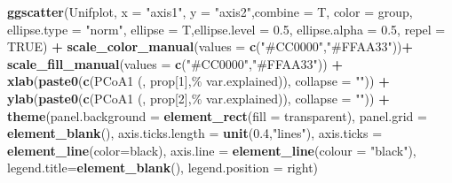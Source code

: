 \documentclass[
]{article}
\newenvironment{Shaded}{\begin{snugshade}}{\end{snugshade}}
\newcommand{\AttributeTok}[1]{\textcolor[rgb]{0.13,0.29,0.53}{#1}}
\newcommand{\ConstantTok}[1]{\textcolor[rgb]{0.56,0.35,0.01}{#1}}
\newcommand{\DecValTok}[1]{\textcolor[rgb]{0.00,0.00,0.81}{#1}}
\newcommand{\FloatTok}[1]{\textcolor[rgb]{0.00,0.00,0.81}{#1}}
\newcommand{\FunctionTok}[1]{\textcolor[rgb]{0.13,0.29,0.53}{\textbf{#1}}}
\newcommand{\NormalTok}[1]{#1}
\newcommand{\SpecialCharTok}[1]{\textcolor[rgb]{0.81,0.36,0.00}{\textbf{#1}}}
\newcommand{\StringTok}[1]{\textcolor[rgb]{0.31,0.60,0.02}{#1}}
\begin{document}
\begin{Shaded}
\begin{Highlighting}[]
\FunctionTok{ggscatter}\NormalTok{(Unifplot, }\AttributeTok{x =} \StringTok{"axis1"}\NormalTok{, }\AttributeTok{y =} \StringTok{"axis2"}\NormalTok{,}\AttributeTok{combine =}\NormalTok{ T, }\AttributeTok{color =} \StringTok{\textquotesingle{}group\textquotesingle{}}\NormalTok{,}
          \AttributeTok{ellipse.type =} \StringTok{"norm"}\NormalTok{, }\AttributeTok{ellipse =}\NormalTok{ T,}\AttributeTok{ellipse.level =} \FloatTok{0.5}\NormalTok{, }\AttributeTok{ellipse.alpha =} \FloatTok{0.5}\NormalTok{, }\AttributeTok{repel =} \ConstantTok{TRUE}\NormalTok{) }\SpecialCharTok{+}
          \FunctionTok{scale\_color\_manual}\NormalTok{(}\AttributeTok{values =} \FunctionTok{c}\NormalTok{(}\StringTok{"\#CC0000"}\NormalTok{,}\StringTok{"\#FFAA33"}\NormalTok{))}\SpecialCharTok{+}
          \FunctionTok{scale\_fill\_manual}\NormalTok{(}\AttributeTok{values =} \FunctionTok{c}\NormalTok{(}\StringTok{"\#CC0000"}\NormalTok{,}\StringTok{"\#FFAA33"}\NormalTok{)) }\SpecialCharTok{+}
          \FunctionTok{xlab}\NormalTok{(}\FunctionTok{paste0}\NormalTok{(}\FunctionTok{c}\NormalTok{(}\StringTok{\textquotesingle{}PCoA1 (\textquotesingle{}}\NormalTok{, prop[}\DecValTok{1}\NormalTok{],}\StringTok{\textquotesingle{}\% var.explained)\textquotesingle{}}\NormalTok{), }\AttributeTok{collapse =} \StringTok{""}\NormalTok{)) }\SpecialCharTok{+} 
          \FunctionTok{ylab}\NormalTok{(}\FunctionTok{paste0}\NormalTok{(}\FunctionTok{c}\NormalTok{(}\StringTok{\textquotesingle{}PCoA1 (\textquotesingle{}}\NormalTok{, prop[}\DecValTok{2}\NormalTok{],}\StringTok{\textquotesingle{}\% var.explained)\textquotesingle{}}\NormalTok{), }\AttributeTok{collapse =} \StringTok{""}\NormalTok{)) }\SpecialCharTok{+}
          \FunctionTok{theme}\NormalTok{(}\AttributeTok{panel.background =} \FunctionTok{element\_rect}\NormalTok{(}\AttributeTok{fill =} \StringTok{\textquotesingle{}transparent\textquotesingle{}}\NormalTok{),}
                \AttributeTok{panel.grid =} \FunctionTok{element\_blank}\NormalTok{(),}
                \AttributeTok{axis.ticks.length =} \FunctionTok{unit}\NormalTok{(}\FloatTok{0.4}\NormalTok{,}\StringTok{"lines"}\NormalTok{),}
                \AttributeTok{axis.ticks =} \FunctionTok{element\_line}\NormalTok{(}\AttributeTok{color=}\StringTok{\textquotesingle{}black\textquotesingle{}}\NormalTok{),}
                \AttributeTok{axis.line =} \FunctionTok{element\_line}\NormalTok{(}\AttributeTok{colour =} \StringTok{"black"}\NormalTok{),}
                \AttributeTok{legend.title=}\FunctionTok{element\_blank}\NormalTok{(),}
                \AttributeTok{legend.position  =} \StringTok{\textquotesingle{}right\textquotesingle{}}\NormalTok{)}
\end{Highlighting}
\end{Shaded}
\end{document}
